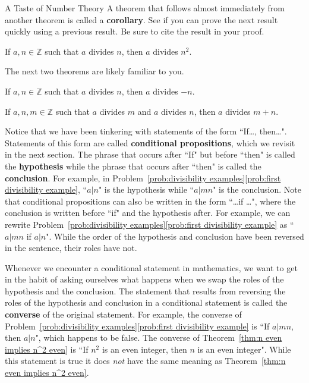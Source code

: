 \begin{section}{A Taste of Number Theory}
A theorem that follows almost immediately from another theorem is called a \textbf{corollary}.  See if you can prove the next result quickly using a previous result.  Be sure to cite the result in your proof.

\begin{corollary}\label{cor:a divs n implies a divs n^2}
If $a,n\in\mathbb{Z}$ such that $a$ divides $n$, then $a$ divides $n^2$.
\end{corollary}

The next two theorems are likely familiar to you.

\begin{theorem}\label{thm:divides negative}
If $a,n\in\mathbb{Z}$ such that $a$ divides $n$, then $a$ divides $-n$. 
\end{theorem}

\begin{theorem}\label{thm:divides sum}
If $a,n,m\in\mathbb{Z}$ such that $a$ divides $m$ and $a$ divides $n$, then $a$ divides $m+n$. 
\end{theorem}

Notice that we have been tinkering with statements of the form ``If\ldots, then\ldots". Statements of this form are called \textbf{conditional propositions}, which we revisit in the next section.  The phrase that occurs after ``If" but before ``then" is called the \textbf{hypothesis} while the phrase that occurs after ``then" is called the \textbf{conclusion}.  For example, in Problem~\ref{prob:divisibility examples}\ref{prob:first divisibility example}, ``$a|n$" is the hypothesis while ``$a|mn$" is the conclusion.  Note that conditional propositions can also be written in the form ``\ldots if \ldots", where the conclusion is written before ``if" and the hypothesis after. For example, we can rewrite Problem~\ref{prob:divisibility examples}\ref{prob:first divisibility example} as ``$a|mn$ if $a|n$".  While the order of the hypothesis and conclusion have been reversed in the sentence, their roles have not.

Whenever we encounter a conditional statement in mathematics, we want to get in the habit of asking ourselves what happens when we swap the roles of the hypothesis and the conclusion.  The statement that results from reversing the roles of the hypothesis and conclusion in a conditional statement is called the \textbf{converse} of the original statement.  For example, the converse of Problem~\ref{prob:divisibility examples}\ref{prob:first divisibility example} is ``If $a|mn$, then $a|n$", which happens to be false. The converse of Theorem~\ref{thm:n even implies n^2 even} is ``If $n^2$ is an even integer, then $n$ is an even integer". While this statement is true it does \emph{not} have the same meaning as Theorem~\ref{thm:n even implies n^2 even}. 


\end{section}
